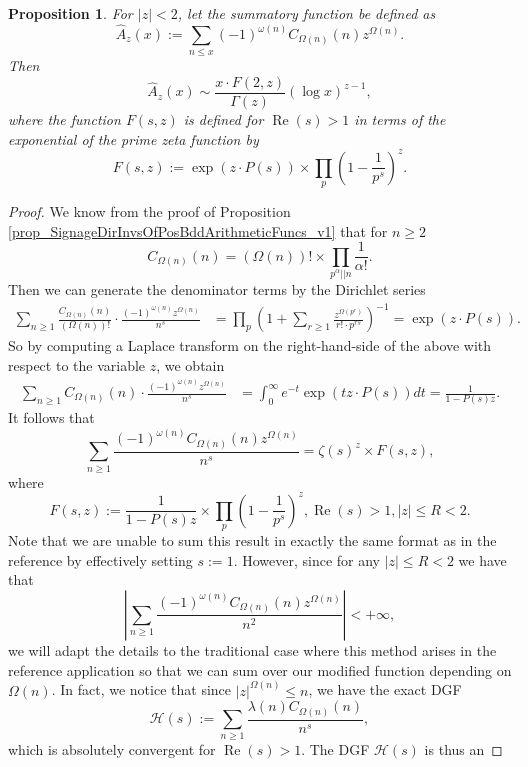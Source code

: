 \documentclass[11pt,reqno,a4letter]{article}
\numberwithin{figure}{section}
\numberwithin{table}{section}
\theoremstyle{plain}
\newtheorem{prop}[theorem]{Proposition}
\numberwithin{theorem}{section}
\theoremstyle{definition}
\renewcommand{\Re}{\operatorname{Re}}
\begin{document}
\begin{prop}
For $|z| < 2$, let the summatory function be defined as 
\[
\widehat{A}_z(x) := \sum_{n \leq x} (-1)^{\omega(n)} 
     C_{\Omega(n)}(n) z^{\Omega(n)}. 
\]
Then 
\[
\widehat{A}_z(x) \sim \frac{x \cdot F(2, z)}{\Gamma(z)} (\log x)^{z-1}, 
\]
where the function $F(s, z)$ is defined for $\Re(s) > 1$ in terms of the 
exponential of the prime zeta function by 
\[
F(s, z) := \exp\left(z \cdot P(s)\right) 
     \times \prod_p \left(1 - \frac{1}{p^s}\right)^{z}. 
\]
\end{prop} 
\begin{proof} 
We know from the proof of 
Proposition \ref{prop_SignageDirInvsOfPosBddArithmeticFuncs_v1} that for $n \geq 2$ 
\[
C_{\Omega(n)}(n) = (\Omega(n))! \times \prod_{p^{\alpha}||n} \frac{1}{\alpha!}. 
\]
Then we can generate the denominator terms by the Dirichlet series 
\begin{align*} 
\sum_{n \geq 1} \frac{C_{\Omega(n)}(n)}{(\Omega(n))!} \cdot 
     \frac{(-1)^{\omega(n)} z^{\Omega(n)}}{n^s} & = \prod_p \left(1 + \sum_{r \geq 1} 
     \frac{z^{\Omega(p^r)}}{r! \cdot p^{rs}}\right)^{-1} 
     = \exp\left(z \cdot P(s)\right). 
\end{align*} 
So by computing a Laplace transform on the right-hand-side of the above with 
respect to the variable $z$, we obtain 
\begin{align*} 
\sum_{n \geq 1} C_{\Omega(n)}(n) \cdot \frac{(-1)^{\omega(n)} z^{\Omega(n)}}{n^s} & = 
     \int_0^{\infty} e^{-t} \exp\left(tz \cdot P(s)\right) dt = \frac{1}{1 - P(s) z}. 
\end{align*} 
It follows that 
\[
\sum_{n \geq 1} \frac{(-1)^{\omega(n)} C_{\Omega(n)}(n) z^{\Omega(n)}}{n^s} = 
     \zeta(s)^z \times F(s, z), 
\]
where 
\[
F(s, z) := \frac{1}{1-P(s) z} \times \prod_p \left(1 - \frac{1}{p^s}\right)^{z}, 
     \Re(s) > 1, |z| \leq R < 2. 
\]
Note that we are unable to sum this result in exactly the same format as in the 
reference \cite[\S 7.4; Thm.\ 7.18]{MV} by effectively setting $s := 1$. 
However, since for any $|z| \leq R < 2$ we have that 
\[
\left\lvert \sum_{n \geq 1} \frac{(-1)^{\omega(n)} C_{\Omega(n)}(n) z^{\Omega(n)}}{n^2} 
     \right\rvert < +\infty, 
\]
we will adapt the details to the traditional case where this method arises in the reference 
application so that we can sum over our modified function depending on $\Omega(n)$. 
In fact, we notice that since $|z|^{\Omega(n)} \leq n$, we have the 
exact DGF 
\[
\mathcal{H}(s) := \sum_{n \geq 1} \frac{\lambda(n) C_{\Omega(n)}(n)}{n^s}, 
\]
which is absolutely convergent for $\Re(s) > 1$. The DGF $\mathcal{H}(s)$ is thus an 

\end{proof}
\end{document}
